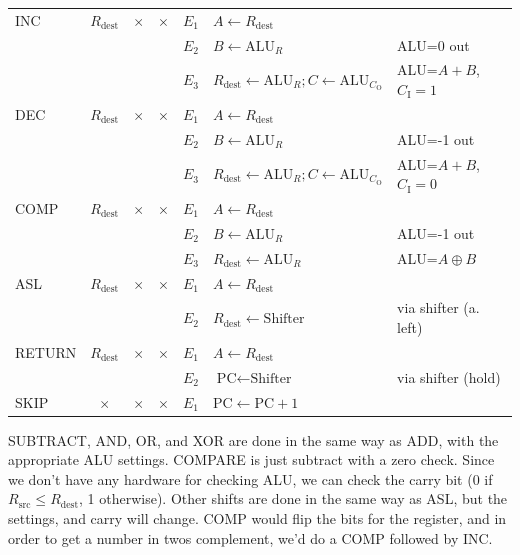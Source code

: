 \documentclass[a4paper, 12pt]{article}
\begin{document}
\begin{center}
\begin{tabular}{l||c|c|c||c|l|l}
                    \hline
                    INC & $R_\text{dest}$ & $\times$ & $\times$ & $E_1$ & $A \leftarrow R_\text{dest}$ & \\
                    & & & & $E_2$ & $B \leftarrow \text{ALU}_R$ & ALU=0 out \\
                    & & & & $E_3$ & $R_\text{dest} \leftarrow \text{ALU}_R; C \leftarrow \text{ALU}_{C_\text{O}}$ & ALU=$A+B$, $C_\text{I} = 1$ \\
                    \hline
                    DEC & $R_\text{dest}$ & $\times$ & $\times$ & $E_1$ & $A \leftarrow R_\text{dest}$ & \\
                    & & & & $E_2$ & $B \leftarrow \text{ALU}_R$ & ALU=-1 out \\
                    & & & & $E_3$ & $R_\text{dest} \leftarrow \text{ALU}_R; C \leftarrow \text{ALU}_{C_\text{O}}$ & ALU=$A+B$, $C_\text{I} = 0$ \\
                    \hline
                    COMP & $R_\text{dest}$ & $\times$ & $\times$ & $E_1$ & $A \leftarrow R_\text{dest}$ & \\
                    & & & & $E_2$ & $B \leftarrow \text{ALU}_R$ & ALU=-1 out \\
                    & & & & $E_3$ & $R_\text{dest} \leftarrow \text{ALU}_R$ & ALU=$A \oplus B$ \\
                    \hline
                    ASL & $R_\text{dest}$ & $\times$ & $\times$ & $E_1$ & $A \leftarrow R_\text{dest}$ & \\
                    & & & & $E_2$ & $R_\text{dest} \leftarrow \text{Shifter}$ & via shifter (a. left) \\
                    \hline
                    RETURN & $R_\text{dest}$ & $\times$ & $\times$ & $E_1$ & $A \leftarrow R_\text{dest}$ & \\
                    & & & & $E_2$ & $\text{PC} \leftarrow \text{Shifter}$ & via shifter (hold) \\
                    \hline
                    SKIP & $\times$ & $\times$ & $\times$ & $E_1$ & $\text{PC} \leftarrow \text{PC} + 1$ & \\
                    \hline
                \end{tabular}
            \end{center}
            SUBTRACT, AND, OR, and XOR are done in the same way as ADD, with the appropriate ALU settings. COMPARE is just subtract with a zero check. Since we don't have any hardware for checking ALU, we can check the carry bit (0 if $R_\text{src} \leq R_\text{dest}$, 1 otherwise). Other shifts are done in the same way as ASL, but the settings, and carry will change. COMP would flip the bits for the register, and in order to get a number in twos complement, we'd do a COMP followed by INC.
            \medskip
\end{document}
